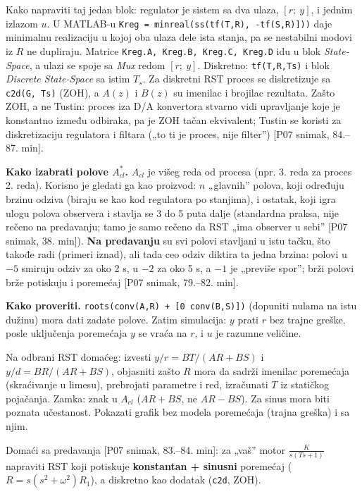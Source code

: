 \documentclass[11pt,a4paper,parskip=half,headsepline,numbers=noenddot]{scrartcl}
\DeclareRobustCommand{\izvor}[1]{{\small\color{izvorC}[#1]}}
\begin{document}
Kako napraviti taj jedan blok: regulator je sistem sa dva ulaza, \([r;\ y]\), i jednim izlazom \(u\). U MATLAB-u \texttt{Kreg\ =\ minreal(\allowbreak{}ss(\allowbreak{}{[}tf(\allowbreak{}T,\allowbreak{}R),\allowbreak{}\ -tf(\allowbreak{}S,\allowbreak{}R){]}))} daje minimalnu realizaciju u kojoj oba ulaza dele ista stanja, pa se nestabilni modovi iz \(R\) ne dupliraju. Matrice \texttt{Kreg.A,\allowbreak{}\ Kreg.B,\allowbreak{}\ Kreg.C,\allowbreak{}\ Kreg.D} idu u blok \emph{State-Space}, a ulazi se spoje sa \emph{Mux} redom \([r;\ y]\). Diskretno: \texttt{tf(\allowbreak{}T,\allowbreak{}R,\allowbreak{}Ts)} i blok \emph{Discrete State-Space} sa istim \(T_s\). Za diskretni RST proces se diskretizuje sa \texttt{c2d(\allowbreak{}G,\allowbreak{}\ Ts)} (ZOH), a \(A(z)\) i \(B(z)\) su imenilac i brojilac rezultata. Zašto ZOH, a ne Tustin: proces iza D/A konvertora stvarno vidi upravljanje koje je konstantno između odbiraka, pa je ZOH tačan ekvivalent; Tustin se koristi za diskretizaciju regulatora i filtara („to ti je proces, nije filter'') \izvor{P07 snimak, 84.--87. min}.

\textbf{Kako izabrati polove \(A_{cl}^*\).} \(A_{cl}\) je višeg reda od procesa (npr. 3. reda za proces 2. reda). Korisno je gledati ga kao proizvod: \(n\) „glavnih'' polova, koji određuju brzinu odziva (biraju se kao kod regulatora po stanjima), i ostatak, koji igra ulogu polova observera i stavlja se 3 do 5 puta dalje (standardna praksa, nije rečeno na predavanju; tamo je samo rečeno da RST „ima observer u sebi'' \izvor{P07 snimak, 38. min}). \textbf{Na predavanju} su svi polovi stavljani u istu tačku, što takođe radi (primeri iznad), ali tada ceo odziv diktira ta jedna brzina: polovi u \(-5\) smiruju odziv za oko 2 s, u \(-2\) za oko 5 s, a \(-1\) je „previše spor''; brži polovi brže potiskuju i poremećaj \izvor{P07 snimak, 79.--82. min}.

\textbf{Kako proveriti.} \texttt{roots(\allowbreak{}conv(\allowbreak{}A,\allowbreak{}R)\ +\ {[}0\ conv(\allowbreak{}B,\allowbreak{}S){]})} (dopuniti nulama na istu dužinu) mora dati zadate polove. Zatim simulacija: \(y\) prati \(r\) bez trajne greške, posle uključenja poremećaja \(y\) se vraća na \(r\), i \(u\) je razumne veličine.

\begin{ispit}
Na odbrani RST domaćeg: izvesti \(y/r = BT/(AR + BS)\) i \(y/d = BR/(AR + BS)\), objasniti zašto \(R\) mora da sadrži imenilac poremećaja (skraćivanje u limesu), prebrojati parametre i red, izračunati \(T\) iz statičkog pojačanja. Zamka: znak u \(A_{cl}\) (\(AR + BS\), ne \(AR - BS\)). Za sinus mora biti poznata učestanost. Pokazati grafik bez modela poremećaja (trajna greška) i sa njim.

Domaći sa predavanja \izvor{P07 snimak, 83.--84. min}: za „vaš'' motor \(\frac{K}{s(Ts+1)}\) napraviti RST koji potiskuje \textbf{konstantan + sinusni} poremećaj (\(R = s(s^2 + \omega^2)R_1\)), a diskretno kao dodatak (\texttt{c2d}, ZOH).
\end{ispit}
\end{document}
